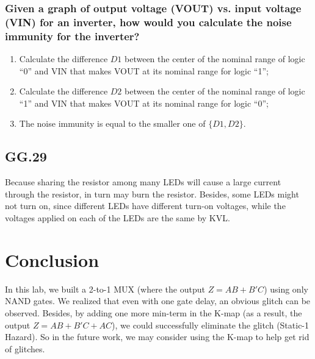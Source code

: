 \documentclass[11pt]{article}
\begin{document}
\subsubsection{Given a graph of output voltage (VOUT) vs. input voltage (VIN) for an inverter, how would you calculate the noise immunity for the inverter?}
\begin{enumerate}
    \item Calculate the difference $D1$ between the center of the nominal range of logic ``0'' and VIN that makes VOUT at its nominal range for logic ``1'';
    \item Calculate the difference $D2$ between the center of the nominal range of logic ``1'' and VIN that makes VOUT at its nominal range for logic ``0'';
    \item The noise immunity is equal to the smaller one of $\{D1, D2\}$. 
\end{enumerate}

\subsection{GG.29}
Because sharing the resistor among many LEDs will cause a large current through the resistor, in turn may burn the resistor. Besides, some LEDs might not turn on, since different LEDs have different turn-on voltages, while the voltages applied on each of the LEDs are the same by KVL.
\section{Conclusion}
In this lab, we built a 2-to-1 MUX (where the output $Z=AB+B'C$) using only NAND gates. We realized that even with one gate delay, an obvious glitch can be observed. Besides, by adding one more min-term in the K-map (as a result, the output $Z=AB+B'C+AC$), we could successfully eliminate the glitch (Static-1 Hazard). So in the future work, we may consider using the K-map to help get rid of glitches.
  
\end{document}
